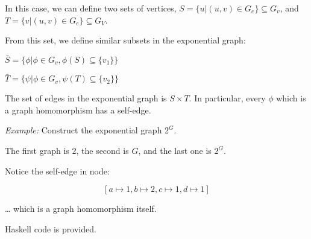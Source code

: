 \documentclass[a4paper,notitlepage]{article}
\begin{document}
\begin{enumerate}
     In this case, we can define two sets of vertices, $S = \{ u \vert (u,v) \in G_e \} \subseteq G_v$, and
     $T = \{ v \vert (u,v) \in G_e \} \subseteq G_V$.

     From this set, we define similar subsets in the exponential graph:

     $\bar{S} = \{ \phi \vert \phi \in G_v, \phi(S) \subseteq \{ v_1 \} \}$

     $\bar{T} = \{ \psi \vert \phi \in G_v, \psi(T) \subseteq \{ v_2 \} \}$

     The set of edges in the exponential graph is $S \times T$. In particular,
     every $\phi$ which is a graph homomorphism has a self-edge.

     {\em Example:} Construct the exponential graph $2^G$. 
     
     \begin{multicols}{2}
     
     \begin{dot2tex}[neato]
       
     \end{dot2tex}
     
     \begin{dot2tex}[neato]
       
     \end{dot2tex}

     \end{multicols}

     {\Large
     \begin{dot2tex}[fdp,autosize,scale=0.5]
       
     \end{dot2tex}
     }
     
     The first graph is $2$, the second is $G$, and the last one is $2^G$.

     Notice the self-edge in node:

     $$ \left [ a \mapsto 1, b \mapsto 2, c \mapsto 1, d \mapsto 1 \right ] $$

     … which is a graph homomorphism itself.

     Haskell code is provided.

     
\end{enumerate}
\end{document}

